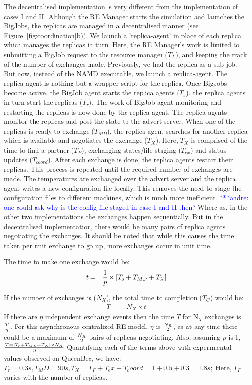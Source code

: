 \documentclass{rspublic}
\newcommand{\alnote}[1]{ {\textcolor{blue} { ***andre: #1 }}}
\newcommand{\alnote}[1]{}
\begin{document}
The decentralised implementation is very different from the implementation 
of cases I and II. Although the RE Manager starts the simulation and launches 
the BigJobs, the replicas are managed in a decentralised manner (see Figure~\ref{fig:coordination}b)). We launch
a 'replica-agent' in place of each replica which manages the replicas in turn.
Here, the RE Manager's work is limited to submitting a BigJob request to the resource manager ($T_{L}$), and keeping the track of the number of exchanges made. Previously, we had the replica as a sub-job. But now, instead of the NAMD executable, we launch a replica-agent.
The replica-agent is nothing but a wrapper script for the replica. 
Once BigJobs become active, the BigJob agent starts the replica agents ($T_{s}$), the replica agents in turn start the replicas ($T_{r}$). The work of BigJob agent monitoring and restarting the replicas is now done by the replica agent. The replica-agents 
monitor the replicas and post the state to the advert server. When one of the 
replicas is ready to exchange ($T_{MD}$), the replica agent searches for another replica which is 
available and negotiates the exchange ($T_{X}$). Here, $T_{X}$ is comprised of the time to find a partner ($T_{F}$), exchanging states/file-staging ($T_{ex}$) and status updates ($T_{coord}$). 
After each exchange is done, the replica agents restart their replicas. This process is repeated until the required number of 
exchanges are made. The temperatures are exchanged over the advert server and the replica agent writes a new configuration file locally. This removes the need to stage the 
configuration files to different machines, which is much more inefficient. \alnote {one could ask why is the 
config file staged in case I and II then?} Where as, in the other two implementations the exchanges happen sequentially. But in the decentralised implementation, there would be many pairs of replica agents negotiating the exchanges. It should be noted that while this causes the time taken per unit exchange to go up, more exchanges occur in unit time. 


The time to make one exchange would be:
\begin{eqnarray}
t &=&  {1 \over p} \times {[T_s+T_{MD} + T_{X}]} 
\label{eq:decent}
\end{eqnarray}

If the number of exchanges is ($N_{X}$), the total time to completion ($T_{C}$) would be:
\begin{eqnarray}
T &=& N_{X} \times t 
\label{eq:decentr}
\end{eqnarray}
If there are $\eta$ independent exchange events then the time $T$ for 
N$_X$ exchanges is $T \over \eta$. For this asynchronous centralized RE model, $\eta$ is $N_R \over 2$, as at any time there could be a maximum of $N_R \over 2$ pairs of replicas negotiating. 
Also, assuming $p$ is 1, $T = [T_r+T_{MD} + T_{X} ] \times N_{X} \over \eta$
Quantifying each of the terms above with experimental values observed on QueenBee, we have:
$T_r = 0.3 s, T_MD=90 s, T_X=T_F+T_ex+T_coord=1+0.5+0.3=1.8 s; $ 
Here, $T_F$ varies with the number of replicas. 
\end{document}
